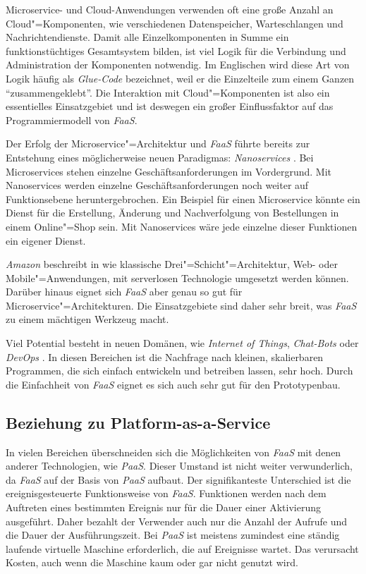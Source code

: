 Microservice- und Cloud-Anwendungen verwenden oft eine große Anzahl an Cloud"=Komponenten, wie verschiedenen Datenspeicher, Warteschlangen und Nachrichtendienste. Damit alle Einzelkomponenten in Summe ein funktionstüchtiges Gesamtsystem bilden, ist viel Logik für die Verbindung und Administration der Komponenten notwendig. Im Englischen wird diese Art von Logik häufig als \textit{Glue-Code} bezeichnet, weil er die Einzelteile zum einem Ganzen "`zusammengeklebt"'. Die Interaktion mit Cloud"=Komponenten ist also ein essentielles Einsatzgebiet und ist deswegen ein großer Einflussfaktor auf das Programmiermodell von \textit{FaaS}.

Der Erfolg der Microservice"=Architektur und \textit{FaaS} führte bereits zur Entstehung eines möglicherweise neuen Paradigmas: \textit{Nanoservices} \cite{infoqFaaS}. Bei Microservices stehen einzelne Geschäftsanforderungen im Vordergrund. Mit Nanoservices werden einzelne Geschäftsanforderungen noch weiter auf Funktionsebene heruntergebrochen. Ein Beispiel für einen Microservice könnte ein Dienst für die Erstellung, Änderung und Nachverfolgung von Bestellungen in einem Online"=Shop sein. Mit Nanoservices wäre jede einzelne dieser Funktionen ein eigener Dienst.

\textit{Amazon} beschreibt in \cite{AwsMultiTier} wie klassische Drei"=Schicht"=Architektur, \zB Web- oder Mobile"=Anwendungen, mit serverlosen Technologie umgesetzt werden können. Darüber hinaus eignet sich \textit{FaaS} aber genau so gut für Microservice"=Architekturen. Die Einsatzgebiete sind daher sehr breit, was \textit{FaaS} zu einem mächtigen Werkzeug macht.

Viel Potential besteht in neuen Domänen, wie \textit{Internet of Things}, \textit{Chat-Bots} oder \textit{DevOps} \cite{NewStackAzurePreview}. In diesen Bereichen ist die Nachfrage nach kleinen, skalierbaren Programmen, die sich einfach entwickeln und betreiben lassen, sehr hoch. Durch die Einfachheit von \textit{FaaS} eignet es sich auch sehr gut für den Prototypenbau.

\subsection{Beziehung zu Platform-as-a-Service}

In vielen Bereichen überschneiden sich die Möglichkeiten von \textit{FaaS} mit denen anderer Technologien, wie \zB \textit{PaaS}. Dieser Umstand ist nicht weiter verwunderlich, da \textit{FaaS} auf der Basis von \textit{PaaS} aufbaut. Der signifikanteste Unterschied ist die ereignisgesteuerte Funktionsweise von \textit{FaaS}. Funktionen werden nach dem Auftreten eines bestimmten Ereignis nur für die Dauer einer Aktivierung ausgeführt. Daher bezahlt der Verwender auch nur die Anzahl der Aufrufe und die Dauer der Ausführungszeit. Bei \textit{PaaS} ist meistens zumindest eine ständig laufende virtuelle Maschine erforderlich, die auf Ereignisse wartet. Das verursacht Kosten, auch wenn die Maschine kaum oder gar nicht genutzt wird.

